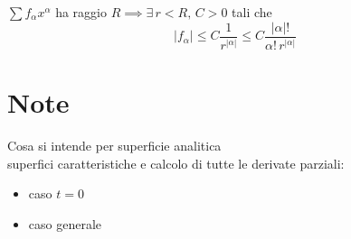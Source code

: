 \begin{theorem}
$\sum f_\alpha x^\alpha$ ha raggio $R \implies \exists \, r<R, \, C>0$ tali che 
$$|f_\alpha | \leq C \frac{1}{r^{|\alpha |}} \leq C \frac{|\alpha |!}{\alpha ! \, r^{|\alpha |}}$$
\end{theorem}



\newpage
\section{Note}
Cosa si intende per superficie analitica\\
superfici caratteristiche e calcolo di tutte le derivate parziali:
\begin{itemize}
\item caso $t=0$
\item caso generale 
\end{itemize}

